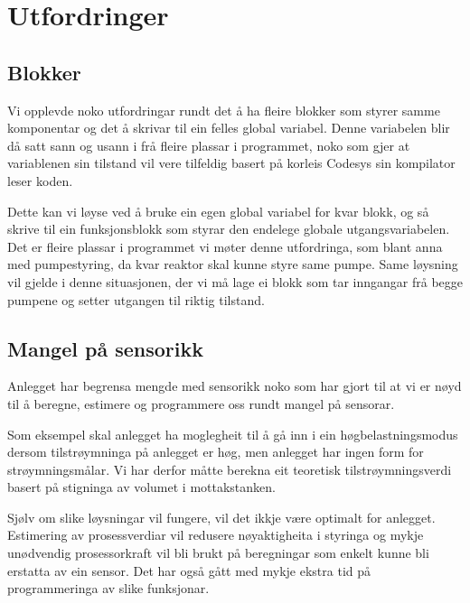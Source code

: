 \section{Utfordringer}
\thispagestyle{fancy}

\subsection{Blokker}
Vi opplevde noko utfordringar rundt det å ha fleire blokker som styrer samme komponentar og det å  
skrivar til ein felles global variabel.
Denne variabelen blir då satt sann og usann i frå fleire plassar i programmet, noko som gjer at 
variablenen sin tilstand vil vere tilfeldig basert på korleis Codesys sin kompilator leser koden.

Dette kan vi løyse ved å bruke ein egen global variabel for kvar blokk, 
og så skrive til ein funksjonsblokk som styrar den endelege globale utgangsvariabelen.
Det er fleire plassar i programmet vi møter denne utfordringa, som blant anna med pumpestyring, 
da kvar reaktor skal kunne styre same pumpe. Same løysning vil gjelde i denne situasjonen, 
der vi må lage ei blokk som tar inngangar frå begge pumpene og setter utgangen til riktig tilstand.  

\subsection{Mangel på sensorikk}

Anlegget har begrensa mengde med sensorikk noko som har gjort til at vi er nøyd til å
beregne, estimere og programmere oss rundt mangel på sensorar.

Som eksempel skal anlegget ha moglegheit til å gå inn i ein
høgbelastningsmodus dersom tilstrøymninga på anlegget er høg, 
men anlegget har ingen form for strøymningsmålar.\newline
Vi har derfor måtte berekna eit teoretisk tilstrøymningsverdi basert på stigninga
av volumet i mottakstanken.

Sjølv om slike løysningar vil fungere, vil det ikkje være optimalt for anlegget.
Estimering av prosessverdiar vil redusere nøyaktigheita i styringa og
mykje unødvendig prosessorkraft vil bli brukt på beregningar som enkelt kunne bli
erstatta av ein sensor. Det har også gått med mykje ekstra tid på programmeringa 
av slike funksjonar.




